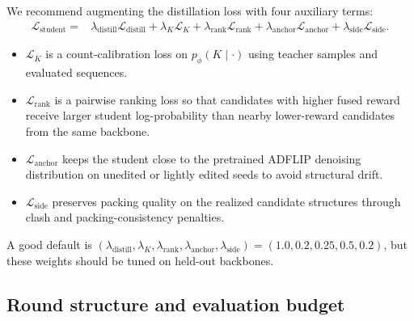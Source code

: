 \documentclass[11pt]{article}
\begin{document}
	We recommend augmenting the distillation loss with four auxiliary terms:
	\begin{align}
		\mathcal{L}_{\mathrm{student}} ={}& \lambda_{\mathrm{distill}}\mathcal{L}_{\mathrm{distill}} + \lambda_K\mathcal{L}_{K} + \lambda_{\mathrm{rank}}\mathcal{L}_{\mathrm{rank}} + \lambda_{\mathrm{anchor}}\mathcal{L}_{\mathrm{anchor}} + \lambda_{\mathrm{side}}\mathcal{L}_{\mathrm{side}}.
	\end{align}
	\begin{itemize}[leftmargin=1.5em]
		\item $\mathcal{L}_K$ is a count-calibration loss on $p_{\phi}(K\mid\cdot)$ using teacher samples and evaluated sequences.
		\item $\mathcal{L}_{\mathrm{rank}}$ is a pairwise ranking loss so that candidates with higher fused reward receive larger student log-probability than nearby lower-reward candidates from the same backbone.
		\item $\mathcal{L}_{\mathrm{anchor}}$ keeps the student close to the pretrained ADFLIP denoising distribution on unedited or lightly edited seeds to avoid structural drift.
		\item $\mathcal{L}_{\mathrm{side}}$ preserves packing quality on the realized candidate structures through clash and packing-consistency penalties.
	\end{itemize}
	A good default is $(\lambda_{\mathrm{distill}},\lambda_K,\lambda_{\mathrm{rank}},\lambda_{\mathrm{anchor}},\lambda_{\mathrm{side}})=(1.0,0.2,0.25,0.5,0.2)$, but these weights should be tuned on held-out backbones.
	
	\subsection{Round structure and evaluation budget}
	
\end{document}
